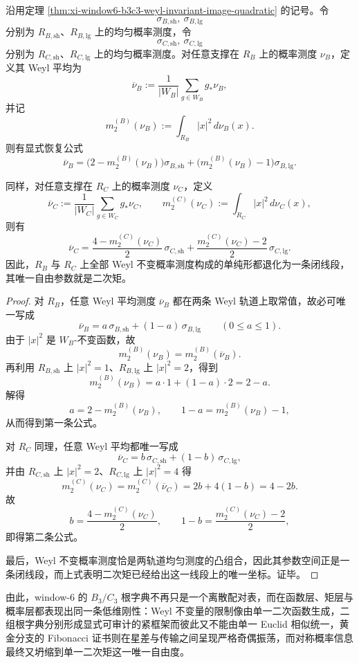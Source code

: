 \begin{theorem}\label{thm:xi-window6-b3c3-weyl-average-measure-second-moment}
沿用定理 \ref{thm:xi-window6-b3c3-weyl-invariant-image-quadratic} 的记号。令
\[
\sigma_{B,\mathrm{sh}},\ \sigma_{B,\mathrm{lg}}
\]
分别为 \(R_{B,\mathrm{sh}}\)、\(R_{B,\mathrm{lg}}\) 上的均匀概率测度，令
\[
\sigma_{C,\mathrm{sh}},\ \sigma_{C,\mathrm{lg}}
\]
分别为 \(R_{C,\mathrm{sh}}\)、\(R_{C,\mathrm{lg}}\) 上的均匀概率测度。对任意支撑在 \(R_B\) 上的概率测度 \(\nu_B\)，定义其 Weyl 平均为
\[
\overline{\nu}_B:=\frac{1}{|W_B|}\sum_{g\in W_B}g_\ast\nu_B,
\]
并记
\[
m_2^{(B)}(\nu_B):=\int_{R_B}|x|^2\,d\nu_B(x).
\]
则有显式恢复公式
\[
\boxed{\;
\overline{\nu}_B
=
\bigl(2-m_2^{(B)}(\nu_B)\bigr)\sigma_{B,\mathrm{sh}}
+
\bigl(m_2^{(B)}(\nu_B)-1\bigr)\sigma_{B,\mathrm{lg}}.\;}
\]

同样，对任意支撑在 \(R_C\) 上的概率测度 \(\nu_C\)，定义
\[
\overline{\nu}_C:=\frac{1}{|W_C|}\sum_{g\in W_C}g_\ast\nu_C,
\qquad
m_2^{(C)}(\nu_C):=\int_{R_C}|x|^2\,d\nu_C(x),
\]
则有
\[
\boxed{\;
\overline{\nu}_C
=
\frac{4-m_2^{(C)}(\nu_C)}{2}\,\sigma_{C,\mathrm{sh}}
+
\frac{m_2^{(C)}(\nu_C)-2}{2}\,\sigma_{C,\mathrm{lg}}.\;}
\]
因此，\(R_B\) 与 \(R_C\) 上全部 Weyl 不变概率测度构成的单纯形都退化为一条闭线段，其唯一自由参数就是二次矩。
\end{theorem}
\begin{proof}
对 \(R_B\)，任意 Weyl 平均测度 \(\overline{\nu}_B\) 都在两条 Weyl 轨道上取常值，故必可唯一写成
\[
\overline{\nu}_B=a\,\sigma_{B,\mathrm{sh}}+(1-a)\,\sigma_{B,\mathrm{lg}}
\qquad (0\le a\le 1).
\]
由于 \(|x|^2\) 是 \(W_B\)-不变函数，故
\[
m_2^{(B)}(\nu_B)=m_2^{(B)}(\overline{\nu}_B).
\]
再利用 \(R_{B,\mathrm{sh}}\) 上 \(|x|^2=1\)、\(R_{B,\mathrm{lg}}\) 上 \(|x|^2=2\)，得到
\[
m_2^{(B)}(\nu_B)
=
a\cdot 1+(1-a)\cdot 2
=
2-a.
\]
解得
\[
a=2-m_2^{(B)}(\nu_B),
\qquad
1-a=m_2^{(B)}(\nu_B)-1,
\]
从而得到第一条公式。

对 \(R_C\) 同理，任意 Weyl 平均都唯一写成
\[
\overline{\nu}_C=b\,\sigma_{C,\mathrm{sh}}+(1-b)\,\sigma_{C,\mathrm{lg}},
\]
并由 \(R_{C,\mathrm{sh}}\) 上 \(|x|^2=2\)、\(R_{C,\mathrm{lg}}\) 上 \(|x|^2=4\) 得
\[
m_2^{(C)}(\nu_C)=m_2^{(C)}(\overline{\nu}_C)=2b+4(1-b)=4-2b.
\]
故
\[
b=\frac{4-m_2^{(C)}(\nu_C)}{2},
\qquad
1-b=\frac{m_2^{(C)}(\nu_C)-2}{2},
\]
即得第二条公式。

最后，Weyl 不变概率测度恰是两轨道均匀测度的凸组合，因此其参数空间正是一条闭线段，而上式表明二次矩已经给出这一线段上的唯一坐标。证毕。
\end{proof}

\noindent
由此，window-\(6\) 的 \(B_3/C_3\) 根字典不再只是一个离散配对表，而在函数层、矩层与概率层都表现出同一条低维刚性：Weyl 不变量的限制像由单一二次函数生成，二组根字典分别形成显式可审计的紧框架而彼此又不能由单一 Euclid 相似统一，黄金分支的 Fibonacci 证书则在星差与传输之间呈现严格奇偶振荡，而对称概率信息最终又坍缩到单一二次矩这一唯一自由度。

\endinput
